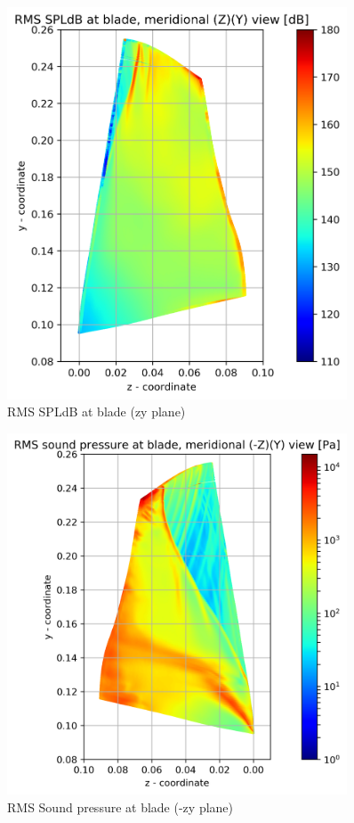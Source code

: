 \begin{figure}[ht]
	\centering
	\includegraphics[width=0.9\textwidth]{Figures/blade-zy-rms-spldb.png}
	\caption{RMS SPLdB at blade (zy plane)} \label{blade-zy-rms-spldb}
\end{figure}

\begin{figure}[ht]
	\centering
	\includegraphics[width=0.9\textwidth]{Figures/blade-negzy-rms-spl.png}
    \caption{RMS Sound pressure at blade (-zy plane)} \label{blade-negzy-rms-spl}
\end{figure}


